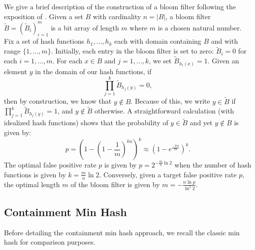 \documentclass[11pt,reqno]{amsart}
\theoremstyle{remark}
\numberwithin{equation}{section}
\begin{document}
We give a brief description of the construction of a bloom filter following the exposition of \cite{mitzenmacher2005probability}. Given a set $B$ with cardinality $n=|B|$, a bloom filter $\tilde{B}=(\tilde{B}_i)_{i=1}^m$ is a bit array of length $m$ where $m$ is a chosen natural number. Fix a set of hash functions $h_1, \dots, h_k$ each with domain containing $B$ and with range $\{1,\dots,m\}$. Initially, each entry in the bloom filter is set to zero: $\tilde{B}_i = 0$ for each $i=1,\dots,m$. For each $x\in B$ and $j=1,\dots,k$, we set
$
\tilde{B}_{h_i(x)} = 1.
$
Given an element $y$ in the domain of our hash functions, if
$$
\prod_{j=1}^k \tilde{B}_{h_j(y)} =0,
$$
then by construction, we know that $y\not \in B$. Because of this, we write $y\in \tilde{B}$ if $\prod_{j=1}^k \tilde{B}_{h_j(y)}=1$, and $y\not \in \tilde{B}$ otherwise. A straightforward calculation (with idealized hash functions) shows that the probability of $y\in \tilde{B}$ and yet $y\not \in B$ is given by:
\begin{equation}\label{p}
p=\left(1-\left(1-\frac{1}{m}\right)^{kn}\right)^k\approx \left(1-e^{\frac{-kn}{m}}\right)^k.
\end{equation}
The optimal false positive rate $p$ is given by $p=2^{-\frac{m}{n}\ln 2}$ when the number of hash functions is given by $k =\frac{m}{n}\ln 2$. Conversely, given a target false positive rate $p$, the optimal length $m$ of the bloom filter is given by $m= -\frac{n\ln p}{\ln^2 2}$.

\subsection{Containment Min Hash}
\label{section:MethodsBounds}
Before detailing the containment min hash approach, we recall the classic min hash for comparison purposes.
\end{document}
